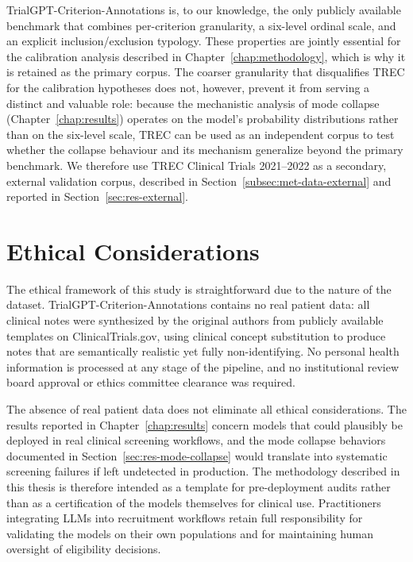 TrialGPT-Criterion-Annotations is, to our knowledge, the only publicly 
available benchmark that combines per-criterion granularity, a 
six-level ordinal scale, and an explicit inclusion/exclusion typology. 
These properties are jointly essential for the calibration analysis 
described in Chapter~\ref{chap:methodology}, which is why it is retained 
as the primary corpus. The coarser granularity that disqualifies TREC 
for the calibration hypotheses does not, however, prevent it from 
serving a distinct and valuable role: because the mechanistic analysis 
of mode collapse (Chapter~\ref{chap:results}) operates on the model's 
probability distributions rather than on the six-level scale, TREC can 
be used as an independent corpus to test whether the collapse behaviour 
and its mechanism generalize beyond the primary benchmark. We therefore 
use TREC Clinical Trials 2021--2022 as a secondary, external validation 
corpus, described in Section~\ref{subsec:met-data-external} and reported 
in Section~\ref{sec:res-external}.

\section{Ethical Considerations}
\label{sec:ctx-ethics}

The ethical framework of this study is straightforward due to the 
nature of the dataset. TrialGPT-Criterion-Annotations contains no 
real patient data: all clinical notes were synthesized by the 
original authors from publicly available templates on 
ClinicalTrials.gov, using clinical concept substitution to produce 
notes that are semantically realistic yet fully non-identifying. No 
personal health information is processed at any stage of the 
pipeline, and no institutional review board approval or ethics 
committee clearance was required.

The absence of real patient data does not eliminate all ethical 
considerations. The results reported in Chapter~\ref{chap:results} 
concern models that could plausibly be deployed in real clinical 
screening workflows, and the mode collapse behaviors documented in 
Section~\ref{sec:res-mode-collapse} would translate into systematic 
screening failures if left undetected in production. The methodology 
described in this thesis is therefore intended as a template for 
pre-deployment audits rather than as a certification of the models 
themselves for clinical use. Practitioners integrating LLMs into 
recruitment workflows retain full responsibility for validating the 
models on their own populations and for maintaining human oversight 
of eligibility decisions.


